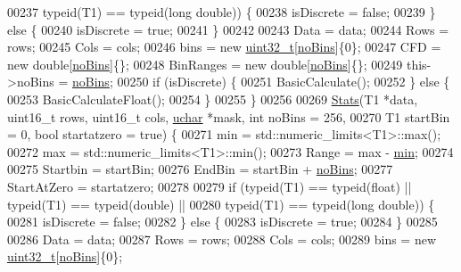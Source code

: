 \begin{DoxyCode}
00237         \textcolor{keyword}{typeid}(T1) == \textcolor{keyword}{typeid}(\textcolor{keywordtype}{long} \textcolor{keywordtype}{double})) \{
00238       isDiscrete = \textcolor{keyword}{false};
00239     \} \textcolor{keywordflow}{else} \{
00240       isDiscrete = \textcolor{keyword}{true};
00241     \}
00242 
00243     Data = data;
00244     Rows = rows;
00245     Cols = cols;
00246     bins = \textcolor{keyword}{new} \hyperlink{_soil_math_types_8h_a435d1572bf3f880d55459d9805097f62}{uint32\_t}[\hyperlink{class_soil_math_1_1_stats_a4202c9085eacaff2e04eda84fc90e92b}{noBins}]\{0\};
00247     CFD = \textcolor{keyword}{new} \textcolor{keywordtype}{double}[\hyperlink{class_soil_math_1_1_stats_a4202c9085eacaff2e04eda84fc90e92b}{noBins}]\{\};
00248     BinRanges = \textcolor{keyword}{new} \textcolor{keywordtype}{double}[\hyperlink{class_soil_math_1_1_stats_a4202c9085eacaff2e04eda84fc90e92b}{noBins}]\{\};
00249     this->noBins = \hyperlink{class_soil_math_1_1_stats_a4202c9085eacaff2e04eda84fc90e92b}{noBins};
00250     \textcolor{keywordflow}{if} (isDiscrete) \{
00251       BasicCalculate();
00252     \} \textcolor{keywordflow}{else} \{
00253       BasicCalculateFloat();
00254     \}
00255   \}
00256 
00269   \hyperlink{class_soil_math_1_1_stats_aa9727b7ea39b46f8a010a7b710b26d83}{Stats}(T1 *data, uint16\_t rows, uint16\_t cols, \hyperlink{_soil_math_types_8h_a65f85814a8290f9797005d3b28e7e5fc}{uchar} *mask, \textcolor{keywordtype}{int} noBins = 256,
00270         T1 startBin = 0, \textcolor{keywordtype}{bool} startatzero = \textcolor{keyword}{true}) \{
00271     min = std::numeric\_limits<T1>::max();
00272     max = std::numeric\_limits<T1>::min();
00273     Range = max - \hyperlink{class_soil_math_1_1_stats_aa44c07a23b1c2ce0f0407e7cee4f39a9}{min};
00274 
00275     Startbin = startBin;
00276     EndBin = startBin + \hyperlink{class_soil_math_1_1_stats_a4202c9085eacaff2e04eda84fc90e92b}{noBins};
00277     StartAtZero = startatzero;
00278 
00279     \textcolor{keywordflow}{if} (\textcolor{keyword}{typeid}(T1) == \textcolor{keyword}{typeid}(\textcolor{keywordtype}{float}) || \textcolor{keyword}{typeid}(T1) == \textcolor{keyword}{typeid}(\textcolor{keywordtype}{double}) ||
00280         \textcolor{keyword}{typeid}(T1) == \textcolor{keyword}{typeid}(\textcolor{keywordtype}{long} \textcolor{keywordtype}{double})) \{
00281       isDiscrete = \textcolor{keyword}{false};
00282     \} \textcolor{keywordflow}{else} \{
00283       isDiscrete = \textcolor{keyword}{true};
00284     \}
00285 
00286     Data = data;
00287     Rows = rows;
00288     Cols = cols;
00289     bins = \textcolor{keyword}{new} \hyperlink{_soil_math_types_8h_a435d1572bf3f880d55459d9805097f62}{uint32\_t}[\hyperlink{class_soil_math_1_1_stats_a4202c9085eacaff2e04eda84fc90e92b}{noBins}]\{0\};

\end{DoxyCode}
